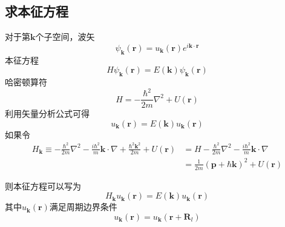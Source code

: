 \subsection{求本征方程}
\par 对于第$\mathbf{k}$个子空间，波矢
\begin{equation}
    \psi_\mathbf{k} (\mathbf{r}) = u_\mathbf{k}(\mathbf{r}) e^{i\mathbf{k}\cdot \mathbf{r}}
\end{equation}
本征方程
\begin{equation}
    H\psi_\mathbf{k} (\mathbf{r}) = E(\mathbf{k}) \psi_\mathbf{k} (\mathbf{r})
\end{equation}
哈密顿算符
\begin{equation}
    H =- \frac{\hbar^2}{2m}\nabla^2 + U(\mathbf{r})
\end{equation}
利用矢量分析公式可得
\begin{equation}
    [- \frac{\hbar^2}{2m}\nabla^2  - \frac{i\hbar^2}{m}\mathbf{k}\cdot \nabla + \frac{\hbar^2 \mathbf{k}^2}{2m}+ U(\mathbf{r})]u_\mathbf{k}(\mathbf{r}) =E(\mathbf{k}) u_\mathbf{k}(\mathbf{r})  
\end{equation}
如果令
\begin{equation}
\begin{aligned}
        H_\mathbf{k}\equiv- \frac{\hbar^2}{2m}\nabla^2  - \frac{i\hbar^2}{m}\mathbf{k}\cdot \nabla + \frac{\hbar^2 \mathbf{k}^2}{2m}+ U(\mathbf{r}) &= H - \frac{\hbar^2}{2m}\nabla^2  - \frac{i\hbar^2}{m}\mathbf{k}\cdot \nabla \\
        &= \frac{1}{2m}(\mathbf{p} + \hbar \mathbf{k})^2 + U(\mathbf{r})
\end{aligned}
\end{equation}

则本征方程可以写为
\begin{equation}
    H_\mathbf{k}u_\mathbf{k}(\mathbf{r}) = E(\mathbf{k}) u_\mathbf{k}(\mathbf{r})
\end{equation}
其中$u_\mathbf{k}(\mathbf{r})$满足周期边界条件
\begin{equation}
    u_\mathbf{k}(\mathbf{r}) = u_\mathbf{k}(\mathbf{r} + \mathbf{R}_l)
\end{equation}
